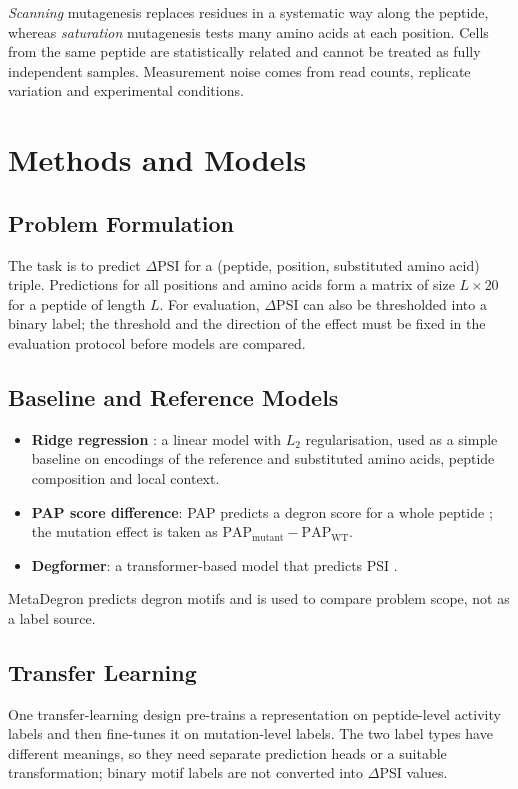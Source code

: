 \emph{Scanning} mutagenesis replaces residues in a systematic way along the peptide, whereas
\emph{saturation} mutagenesis tests many amino acids at each position. Cells from the same peptide are
statistically related and cannot be treated as fully independent samples. Measurement noise comes from
read counts, replicate variation and experimental conditions.

\section{Methods and Models}
\subsection{Problem Formulation}
The task is to predict $\Delta$PSI for a (peptide, position, substituted amino acid) triple. Predictions for
all positions and amino acids form a matrix of size $L\times 20$ for a peptide of length $L$. For
evaluation, $\Delta$PSI can also be thresholded into a binary label; the threshold and the direction of
the effect must be fixed in the evaluation protocol before models are compared.

\subsection{Baseline and Reference Models}
\begin{itemize}
  \item \textbf{Ridge regression} \citep{hoerl1970}: a linear model with $L_2$ regularisation, used as a simple baseline on
        encodings of the reference and substituted amino acids, peptide composition and local context.
  \item \textbf{PAP score difference}: PAP predicts a degron score for a whole peptide \citep{voutsinos2026}; the
        mutation effect is taken as $\mathrm{PAP}_{\mathrm{mutant}}-\mathrm{PAP}_{\mathrm{WT}}$.
  \item \textbf{Degformer}: a transformer-based model \citep{vaswani2017} that predicts PSI \citep{degformer}.
\end{itemize}
MetaDegron \citep{zheng2024} predicts degron motifs and is used to compare problem scope, not as a label source.

\subsection{Transfer Learning}
One transfer-learning design pre-trains a representation on peptide-level activity labels and then fine-tunes it on
mutation-level labels. The two label types have different meanings, so they need separate prediction heads
or a suitable transformation; binary motif labels are not converted into $\Delta$PSI values.

